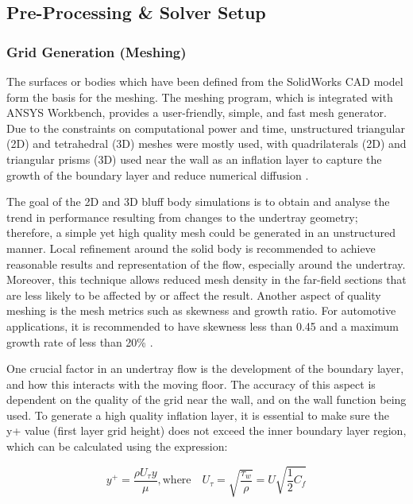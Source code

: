 \subsection{Pre-Processing \& Solver Setup}

\subsubsection{Grid Generation (Meshing)}
\noindent The surfaces or bodies which have been defined from the SolidWorks CAD model form the basis for the meshing. The meshing program, which is integrated with ANSYS Workbench, provides a user-friendly, simple, and fast mesh generator. Due to the constraints on computational power and time, unstructured triangular (2D) and tetrahedral (3D) meshes were mostly used, with quadrilaterals (2D) and triangular prisms (3D) used near the wall as an inflation layer to capture the growth of the boundary layer and reduce numerical diffusion \cite{Lanfrit2005BestFLUENT}.

\noindent The goal of the 2D and 3D bluff body simulations is to obtain and analyse the trend in performance resulting from changes to the undertray geometry; therefore, a simple yet high quality mesh could be generated in an unstructured manner. Local refinement around the solid body is recommended \cite{Lanfrit2005BestFLUENT} to achieve reasonable results and representation of the flow, especially around the undertray. Moreover, this technique allows reduced mesh density in the far-field sections that are less likely to be affected by or affect the result. Another aspect of quality meshing is the mesh metrics such as skewness and growth ratio. For automotive applications, it is recommended to have skewness less than 0.45 and a maximum growth rate of less than 20\% \cite{Lanfrit2005BestFLUENT}. 

\noindent One crucial factor in an undertray flow is the development of the boundary layer, and how this interacts with the moving floor. The accuracy of this aspect is dependent on the quality of the grid near the wall, and on the wall function being used. To generate a high quality inflation layer, it is essential to make sure the y+ value (first layer grid height) does not exceed the inner boundary layer region, which can be calculated using the expression:

\begin{equation}
    y^+ = \frac{\rho U_\tau y}{\mu}, \text{where}\quad U_\tau = \sqrt{\frac{\tau_w}{\rho}} = U \sqrt{\frac{1}{2}C_f}
\end{equation}

